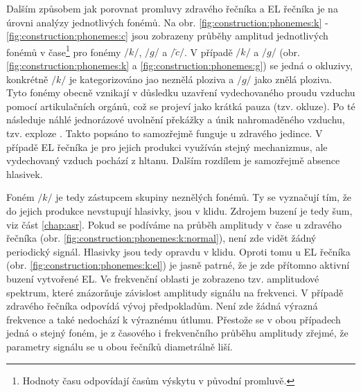 Dalším způsobem jak porovnat promluvy zdravého řečníka  a EL řečníka je na úrovni analýzy jednotlivých fonémů.
Na obr. \ref{fig:construction:phonemes:k} - \ref{fig:construction:phonemes:c} jsou zobrazeny průběhy amplitud jednotlivých fonémů v čase\footnote{Hodnoty času odpovídají časům výskytu v původní promluvě.} pro fonémy $/k/$, $/g/$ a $/\check{c}/$.
V případě $/k/$ a $/g/$ (obr. \ref{fig:construction:phonemes:k} a \ref{fig:construction:phonemes:g}) se jedná o okluzivy, konkrétně $/k/$ je kategorizováno jao neznělá ploziva a $/g/$ jako znělá ploziva.
Tyto fonémy obecně vznikají v důsledku uzavření vydechovaného proudu vzduchu pomocí artikulačních orgánů, což se projeví jako krátká pauza (tzv. okluze).
Po té následuje náhlé jednorázové uvolnění překážky a únik nahromaděného vzduchu, tzv. exploze \cite{Psutka2006}.
Takto popsáno to samozřejmě funguje u zdravého jedince.
V případě EL řečníka je pro jejich produkci využíván stejný mechanizmus, ale vydechovaný vzduch pochází z hltanu.
Dalším rozdílem je samozřejmě absence hlasivek.

Foném $/k/$ je tedy zástupcem skupiny neznělých fonémů.
Ty se vyznačují tím, že do jejich produkce nevstupují hlasivky, jsou v klidu.
Zdrojem buzení je tedy šum, viz část \ref{chap:asr}.
Pokud se podíváme na průběh amplitudy v čase u zdravého řečníka (obr. \ref{fig:construction:phonemes:k:normal}), není zde vidět žádný periodický signál.
Hlasivky jsou tedy opravdu v klidu.
Oproti tomu u EL řečníka (obr. \ref{fig:construction:phonemes:k:el}) je jasně patrné, že je zde přítomno aktivní buzení vytvořené EL.
Ve frekvenční oblasti je zobrazeno tzv. amplitudové spektrum, které znázorňuje závislost amplitudy signálu na frekvenci.
V případě zdravého řečníka odpovídá vývoj předpokladům.
Není zde žádná výrazná frekvence a také nedochází k výraznému útlumu.
Přestože se v obou případech jedná o stejný foném, je z časového i frekvenčního průběhu amplitudy zřejmé, že parametry signálu se u obou řečníků diametrálně liší.


